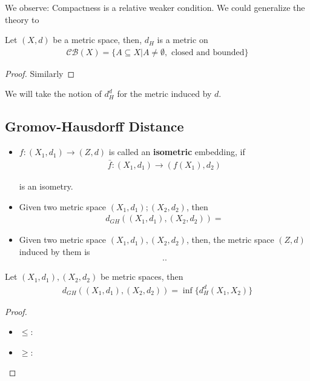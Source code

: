 \documentclass[Total.tex]{subfiles}
\begin{document}
			We observe: Compactness is a relative weaker condition. We could generalize the theory to 
			\begin{proposition}
				Let $(X,d)$ be a metric space, then, $d_H$ is a metric on 
				\begin{gather*}
					\mathcal{CB}(X)=\{A\subseteq X|A\not=\emptyset,\mbox{ closed and bounded}\}
				\end{gather*}
			\end{proposition}
			\begin{proof}
				Similarly
			\end{proof}
			
			We will take the notion of $d_H^d$ for the metric induced by $d$.
			
			
		\subsection{Gromov-Hausdorff Distance}
		
		\begin{Def}
			\begin{itemize}
				\item $f:(X_1,d_1)\rightarrow (Z,d)$ is called an \textbf{isometric} embedding, if 
				\begin{gather*}
					\bar{f}:(X_1,d_1)\rightarrow (f(X_1),d_2)
				\end{gather*}
				
				is an isometry.
				\item Given two metric space $(X_1,d_1);(X_2,d_2)$, then
				\begin{gather*}
					d_{GH}((X_1,d_1),(X_2,d_2))=
				\end{gather*}
				\item Given two metric space $(X_1,d_1),(X_2,d_2)$, then, the metric space $(Z,d)$ induced by them is 
				\begin{gather*}
					..
				\end{gather*}
			\end{itemize}
		\end{Def}
		
		\begin{proposition}
			Let $(X_1,d_1),(X_2,d_2)$ be metric spaces, then
			\begin{gather*}
				d_{GH}((X_1,d_1),(X_2,d_2))=\inf\{d_H^d(X_1,X_2)\}
			\end{gather*}
		\end{proposition}
		\begin{proof}
			\begin{itemize}
				\item $\leq$:
				
				
				\item $\geq$:
			\end{itemize}
		\end{proof}
		
\end{document}
